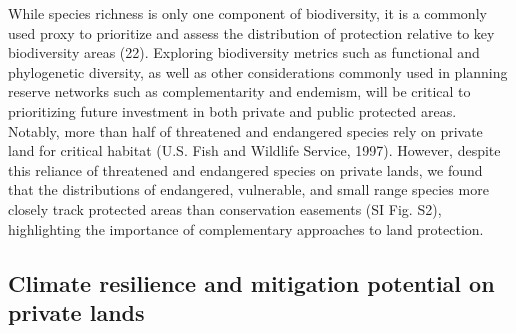 \documentclass[3p]{elsarticle} %
\begin{document}
While species richness is only one component of biodiversity, it is a
commonly used proxy to prioritize and assess the distribution of
protection relative to key biodiversity areas (22). Exploring
biodiversity metrics such as functional and phylogenetic diversity, as
well as other considerations commonly used in planning reserve networks
such as complementarity and endemism, will be critical to prioritizing
future investment in both private and public protected areas. Notably,
more than half of threatened and endangered species rely on private land
for critical habitat (U.S. Fish and Wildlife Service, 1997). However,
despite this reliance of threatened and endangered species on private
lands, we found that the distributions of endangered, vulnerable, and
small range species more closely track protected areas than conservation
easements (SI Fig. S2), highlighting the importance of complementary
approaches to land protection.

\hypertarget{climate-resilience-and-mitigation-potential-on-private-lands}{%
\subsection{Climate resilience and mitigation potential on private
lands}\label{climate-resilience-and-mitigation-potential-on-private-lands}}
\end{document}
